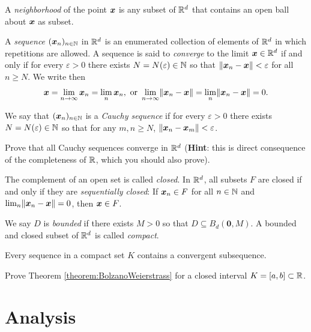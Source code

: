 A \emph{neighborhood} of the point $\boldsymbol{x}$ is any subset of $\mathbb{R}^d$ that contains an open ball about $\boldsymbol{x}$ as subset. 

A \emph{sequence} $({\boldsymbol{x}}_{n})_{{n}\in\mathbb{N}}$ in $\mathbb{R}^d$ is an enumerated collection of elements of $\mathbb{R}^d$ in which repetitions are allowed.  A sequence is said to \emph{converge} to the limit $\boldsymbol{x} \in \mathbb{R}^d$ if and only if for every $\varepsilon>0$ there exists $N=N(\varepsilon) \in \mathbb{N}$ so that $\lVert \boldsymbol{x}_n - \boldsymbol{x} \rVert < \varepsilon$ for all $n \geq N$.  We write then 
\begin{equation*}
\boldsymbol{x} = \lim_{n\to\infty} \boldsymbol{x}_n = \lim_n \boldsymbol{x}_n, \text{ or } \lim_{n\to\infty} \lVert \boldsymbol{x}_n - \boldsymbol{x} \rVert = \lim_n \lVert \boldsymbol{x}_n - \boldsymbol{x} \rVert = 0.
\end{equation*}

We say that $({\boldsymbol{x}}_{n})_{{n}\in\mathbb{N}}$ is a \emph{Cauchy sequence} if for every $\varepsilon>0$ there exists $N = N(\varepsilon) \in \mathbb{N}$ so that for any $m,n \geq N$, $\lVert \boldsymbol{x}_n - \boldsymbol{x}_m \rVert < \varepsilon$.  

\begin{problem}\label{problem:Rdcomplete}
Prove that all Cauchy sequences converge in $\mathbb{R}^d$ (\textbf{Hint}: this is direct consequence of the completeness of $\mathbb{R}$, which you should also prove).
\end{problem}

The complement of an open set is called \emph{closed}. In $\mathbb{R}^d$, all subsets $F$ are closed if and only if they are \emph{sequentially closed}: If $\boldsymbol{x}_n\in F$ for all $n \in \mathbb{N}$ and $\lim_n \lVert \boldsymbol{x}_n - \boldsymbol{x} \rVert = 0$, then $\boldsymbol{x} \in F$.

We say $D$ is \emph{bounded} if there exists $M>0$ so that $D \subseteq B_d(\boldsymbol{0}, M)$.  A bounded and closed subset of $\mathbb{R}^d$ is called \emph{compact}.

\begin{theorem}\label{theorem:BolzanoWeierstrass}
Every sequence in a compact set $K$ contains a convergent subsequence.
\end{theorem}

\begin{problem}\label{problem:BolzanoWeierstrass}
Prove Theorem \ref{theorem:BolzanoWeierstrass} for a closed interval $K=[a,b] \subset \mathbb{R}$.
\end{problem}

\section{Analysis}

